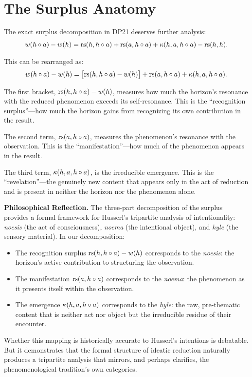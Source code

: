 \section{The Surplus Anatomy}

The exact surplus decomposition in DP21 deserves further analysis:
\[
w(h \circ a) - w(h) = \mathrm{rs}(h, h \circ a) + \mathrm{rs}(a, h \circ a)
+ \kappa(h, a, h \circ a) - \mathrm{rs}(h, h).
\]

This can be rearranged as:
\[
w(h \circ a) - w(h) = \bigl[\mathrm{rs}(h, h \circ a) - w(h)\bigr]
+ \mathrm{rs}(a, h \circ a) + \kappa(h, a, h \circ a).
\]

The first bracket, $\mathrm{rs}(h, h \circ a) - w(h)$, measures how much
the horizon's resonance with the reduced phenomenon exceeds its
self-resonance. This is the ``recognition surplus''---how much the
horizon gains from recognizing its own contribution in the result.

The second term, $\mathrm{rs}(a, h \circ a)$, measures the phenomenon's
resonance with the observation. This is the ``manifestation''---how
much of the phenomenon appears in the result.

The third term, $\kappa(h, a, h \circ a)$, is the irreducible
emergence. This is the ``revelation''---the genuinely new content that
appears only in the act of reduction and is present in neither the
horizon nor the phenomenon alone.

\begin{reflectionbox}
\textbf{Philosophical Reflection.}
The three-part decomposition of the surplus provides a formal framework
for Husserl's tripartite analysis of intentionality: \textit{noesis}
(the act of consciousness), \textit{noema} (the intentional object),
and \textit{hyle} (the sensory material). In our decomposition:
\begin{itemize}
\item The recognition surplus $\mathrm{rs}(h, h \circ a) - w(h)$
corresponds to the \textit{noesis}: the horizon's active contribution
to structuring the observation.
\item The manifestation $\mathrm{rs}(a, h \circ a)$ corresponds to the
\textit{noema}: the phenomenon as it presents itself within the
observation.
\item The emergence $\kappa(h, a, h \circ a)$ corresponds to the
\textit{hyle}: the raw, pre-thematic content that is neither act nor
object but the irreducible residue of their encounter.
\end{itemize}
Whether this mapping is historically accurate to Husserl's intentions is
debatable. But it demonstrates that the formal structure of ideatic
reduction naturally produces a tripartite analysis that mirrors, and
perhaps clarifies, the phenomenological tradition's own categories.
\end{reflectionbox}

